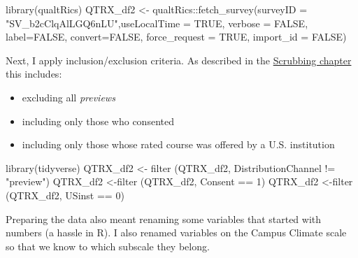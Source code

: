 \documentclass[
]{book}
\newenvironment{Shaded}{\begin{snugshade}}{\end{snugshade}}
\newcommand{\AttributeTok}[1]{\textcolor[rgb]{0.77,0.63,0.00}{#1}}
\newcommand{\ConstantTok}[1]{\textcolor[rgb]{0.00,0.00,0.00}{#1}}
\newcommand{\DecValTok}[1]{\textcolor[rgb]{0.00,0.00,0.81}{#1}}
\newcommand{\FunctionTok}[1]{\textcolor[rgb]{0.00,0.00,0.00}{#1}}
\newcommand{\NormalTok}[1]{#1}
\newcommand{\OtherTok}[1]{\textcolor[rgb]{0.56,0.35,0.01}{#1}}
\newcommand{\SpecialCharTok}[1]{\textcolor[rgb]{0.00,0.00,0.00}{#1}}
\newcommand{\StringTok}[1]{\textcolor[rgb]{0.31,0.60,0.02}{#1}}
\providecommand{\tightlist}{%
  \setlength{\itemsep}{0pt}\setlength{\parskip}{0pt}}
\begin{document}
\begin{Shaded}
\begin{Highlighting}[]
\FunctionTok{library}\NormalTok{(qualtRics)}
\NormalTok{QTRX\_df2 }\OtherTok{\textless{}{-}}\NormalTok{ qualtRics}\SpecialCharTok{::}\FunctionTok{fetch\_survey}\NormalTok{(}\AttributeTok{surveyID =} \StringTok{"SV\_b2cClqAlLGQ6nLU"}\NormalTok{,}\AttributeTok{useLocalTime =} \ConstantTok{TRUE}\NormalTok{,}
                         \AttributeTok{verbose =} \ConstantTok{FALSE}\NormalTok{, }\AttributeTok{label=}\ConstantTok{FALSE}\NormalTok{, }\AttributeTok{convert=}\ConstantTok{FALSE}\NormalTok{, }\AttributeTok{force\_request =} \ConstantTok{TRUE}\NormalTok{, }\AttributeTok{import\_id =} \ConstantTok{FALSE}\NormalTok{)}
\end{Highlighting}
\end{Shaded}

Next, I apply inclusion/exclusion criteria. As described in the \protect\hyperlink{scrub}{Scrubbing chapter} this includes:

\begin{itemize}
\tightlist
\item
  excluding all \emph{previews}
\item
  including only those who consented
\item
  including only those whose rated course was offered by a U.S. institution
\end{itemize}

\begin{Shaded}
\begin{Highlighting}[]
\FunctionTok{library}\NormalTok{(tidyverse)}
\NormalTok{QTRX\_df2 }\OtherTok{\textless{}{-}} \FunctionTok{filter}\NormalTok{ (QTRX\_df2, DistributionChannel }\SpecialCharTok{!=} \StringTok{"preview"}\NormalTok{)}
\NormalTok{QTRX\_df2 }\OtherTok{\textless{}{-}}\FunctionTok{filter}\NormalTok{ (QTRX\_df2, Consent }\SpecialCharTok{==} \DecValTok{1}\NormalTok{)}
\NormalTok{QTRX\_df2 }\OtherTok{\textless{}{-}}\FunctionTok{filter}\NormalTok{ (QTRX\_df2, USinst }\SpecialCharTok{==} \DecValTok{0}\NormalTok{)}
\end{Highlighting}
\end{Shaded}

Preparing the data also meant renaming some variables that started with numbers (a hassle in R). I also renamed variables on the Campus Climate scale so that we know to which subscale they belong.
\end{document}
